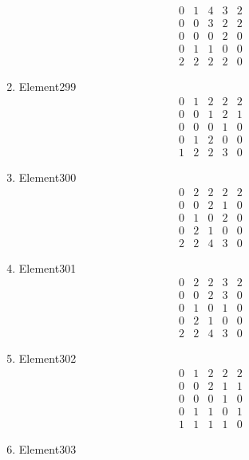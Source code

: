 \documentclass[12pt]{article}
\begin{document}
\begin{multicols}{3}
\begin{enumerate}
\begin{equation*}
\begin{array}{ccccc}
0&1&4&3&2\\
0&0&3&2&2\\
0&0&0&2&0\\
0&1&1&0&0\\
2&2&2&2&0
\end{array}
\end{equation*}
\item Element299
\begin{equation*}
\begin{array}{ccccc}
0&1&2&2&2\\
0&0&1&2&1\\
0&0&0&1&0\\
0&1&2&0&0\\
1&2&2&3&0
\end{array}
\end{equation*}
\item Element300
\begin{equation*}
\begin{array}{ccccc}
0&2&2&2&2\\
0&0&2&1&0\\
0&1&0&2&0\\
0&2&1&0&0\\
2&2&4&3&0
\end{array}
\end{equation*}
\item Element301
\begin{equation*}
\begin{array}{ccccc}
0&2&2&3&2\\
0&0&2&3&0\\
0&1&0&1&0\\
0&2&1&0&0\\
2&2&4&3&0
\end{array}
\end{equation*}
\item Element302
\begin{equation*}
\begin{array}{ccccc}
0&1&2&2&2\\
0&0&2&1&1\\
0&0&0&1&0\\
0&1&1&0&1\\
1&1&1&1&0
\end{array}
\end{equation*}
\item Element303
\begin{equation*}
\begin{array}{ccccc}

\end{array}
\end{equation*}
\end{enumerate}
\end{multicols}
\end{document}
